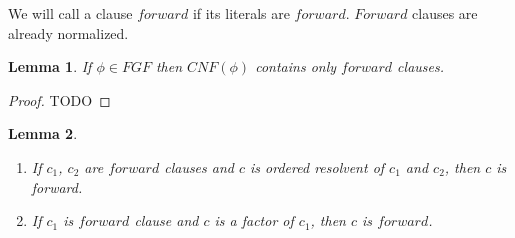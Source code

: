 \documentclass[english, shortabstract]{iithesis}
\theoremstyle{definition} \newtheorem{definition}{Definition}[chapter]
\theoremstyle{remark} \newtheorem{remark}[definition]{Observation}
\theoremstyle{plain} \newtheorem{theorem}[definition]{Theorem}
\theoremstyle{plain} \newtheorem{lemma}[definition]{Lemma}
\begin{document}
We will call a clause $forward$ if its literals are $forward$. $Forward$ clauses are already normalized.

\begin{lemma}
If $\phi \in FGF$ then $CNF(\phi)$ contains only $forward$ clauses.
\end{lemma}

\begin{proof}
TODO
\end{proof}

\begin{lemma}
\begin{enumerate}
    \item If $c_1$, $c_2$ are $forward$ clauses and $c$ is ordered resolvent of $c_1$ and $c_2$, then $c$ is forward.
    \item If $c_1$ is $forward$ clause and $c$ is a factor of $c_1$, then $c$ is $forward$.  
\end{enumerate}
\end{lemma}
\end{document}
